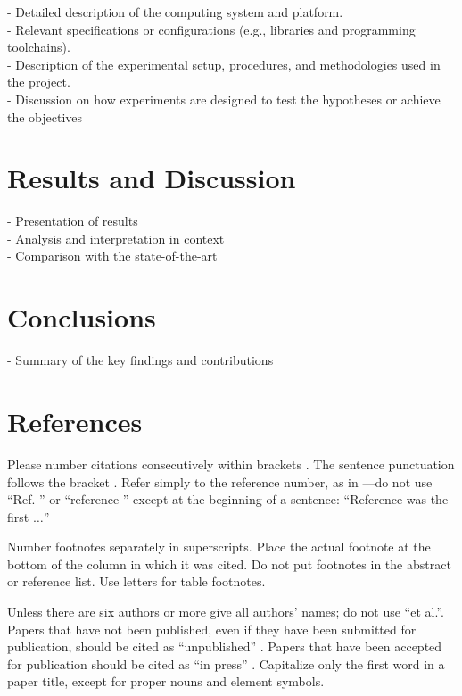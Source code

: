 \documentclass[conference]{IEEEtran}
\begin{document}
- Detailed description of the computing system and platform. \\
- Relevant specifications or configurations (e.g., libraries
and programming toolchains). \\
- Description of the experimental setup, procedures, and
methodologies used in the project. \\
- Discussion on how experiments are designed to test the hypotheses
or achieve the objectives \\

\blindtext\blindtext

\section{Results and Discussion}

- Presentation of results \\
- Analysis and interpretation in context \\
- Comparison with the state-of-the-art \\

\blindtext\blindtext


\section{Conclusions}

- Summary of the key findings and contributions


\section*{References}

Please number citations consecutively within brackets \cite{b1}. The 
sentence punctuation follows the bracket \cite{b2}. Refer simply to the reference 
number, as in \cite{b3}---do not use ``Ref. \cite{b3}'' or ``reference \cite{b3}'' except at 
the beginning of a sentence: ``Reference \cite{b3} was the first $\ldots$''

Number footnotes separately in superscripts. Place the actual footnote at 
the bottom of the column in which it was cited. Do not put footnotes in the 
abstract or reference list. Use letters for table footnotes.

Unless there are six authors or more give all authors' names; do not use 
``et al.''. Papers that have not been published, even if they have been 
submitted for publication, should be cited as ``unpublished'' \cite{b4}. Papers 
that have been accepted for publication should be cited as ``in press'' \cite{b5}. 
Capitalize only the first word in a paper title, except for proper nouns and 
element symbols.
\end{document}
